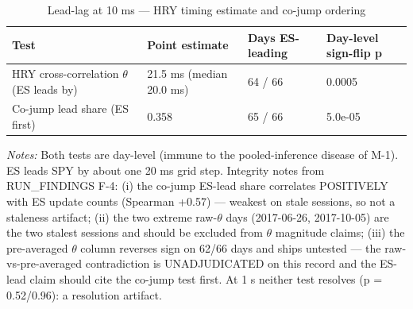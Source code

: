 \begin{table}[htbp]\centering
\caption{Lead-lag at 10 ms — HRY timing estimate and co-jump ordering}
\label{tab:t7}
\small
\begin{tabular}{llll}
\toprule
Test & Point estimate & Days ES-leading & Day-level sign-flip p \\
\midrule
HRY cross-correlation $\theta$ (ES leads by) & 21.5 ms (median 20.0 ms) & 64 / 66 & 0.0005 \\
Co-jump lead share (ES first) & 0.358 & 65 / 66 & 5.0e-05 \\
\bottomrule
\end{tabular}
\begin{minipage}{\linewidth}\vspace{2pt}\footnotesize\emph{Notes:} Both tests are day-level (immune to the pooled-inference disease of M-1). ES leads SPY by about one 20 ms grid step. Integrity notes from RUN\_FINDINGS F-4: (i) the co-jump ES-lead share correlates POSITIVELY with ES update counts (Spearman +0.57) — weakest on stale sessions, so not a staleness artifact; (ii) the two extreme raw-$\theta$ days (2017-06-26, 2017-10-05) are the two stalest sessions and should be excluded from $\theta$ magnitude claims; (iii) the pre-averaged $\theta$ column reverses sign on 62/66 days and ships untested — the raw-vs-pre-averaged contradiction is UNADJUDICATED on this record and the ES-lead claim should cite the co-jump test first. At 1 s neither test resolves (p = 0.52/0.96): a resolution artifact.\end{minipage}
\end{table}
